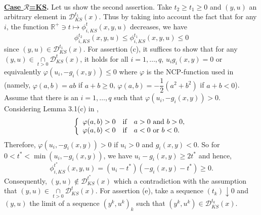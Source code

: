  \medskip
${}$\\
\noindent\textbf{\underline{Case $\mathcal{R}$=KS}.} Let us show the second assertion. Take  $t_{2}\geq t_{1} \geq 0$ and
$(y,u)$ an arbitrary element in $ \mathcal{D}_{KS}^{t_{1}}(x)$. Thus by taking into account the fact that for  any $i$, the function $\mathbb{R}^{+}\ni
t\longmapsto\phi^{t}_{i,KS}(x,y,u) $ decreases, 
we have
$$ \phi^{t_2}_{i,KS}(x,y,u) \leq \phi^{t_1}_{i,KS}(x,y,u)\leq 0$$
since $(y,u)\in \mathcal{D}_{KS}^{t_{1}}(x)$.
For assertion (c), it suffices to show that for any $(y,u)\in \underset{t>0}{\cap}\mathcal{D}_{KS}^{t}(x)$, it holds for all $i=1,\ldots,q$, $u_{i}g_{i}(x,y)=0$ 
or equivalently $\varphi(u_{i},-g_{i}(x,y))\leq 0$  where $\varphi$ is the NCP-function used in \cite{KS} (namely, $\varphi(a,b)=ab$ if $a+b\geq0$, $\varphi(a,b)=-\dfrac{1}{2}(a^{2}+b^{2})$ if $a+b<0$). 
Assume that there is an  $i=1,\ldots,q$ such that $\varphi(u_{i},-g_{i}(x,y))> 0$. Considering Lemma 3.1(c) in \cite{KS},
\[
\left\{
\begin{array}[c]{l}
\varphi(a,b)>0\text{\ \ \ if \ \ }a>0\text{ and }b>0,\\
\varphi(a,b)<0\text{\ \ \ if \ \ }a<0\text{ or }b<0.
\end{array}
\right.
\]
Therefore, $\varphi(u_{i},-g_{i}(x,y))> 0$ if $u_{i}>0$ and $g_{i}(x,y)<0$. So for $0<t^{*}< \min(u_{i},-g_{i}(x,y))$, we have $ u_{i}-g_{i}(x,y)\geq 2t^{*}$ and hence, 
\[
\phi^{t^{*}}_{i,KS}(x,y,u) =(u_{i}-t^{*})(-g_{i}(x,y)-t^{*})\geq 0.
\]
Consequently,  $(y,u)\notin \mathcal{D}_{KS}^{t^{*}}(x)$ which a contradiction with the assumption that $(y,u)\in \underset{t>0}{\cap}\mathcal{D}_{KS}^{t}(x).$
For assertion (e), take a sequence $(t_{k})\downarrow0$ and $(y,u)$ the  limit of a sequence $(y^{k},u^{k})_{k}$
such that $(y^{k},u^{k})\in\mathcal{D}_{KS}^{t_{k}
}(x)$.
